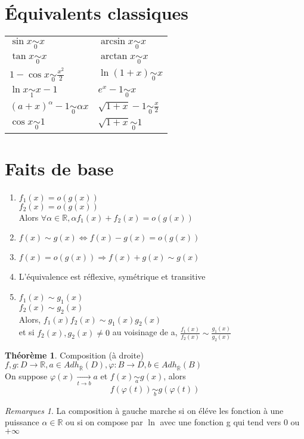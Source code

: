 \documentclass[fleqn]{article}
\theoremstyle{definition} \newtheorem*{defi}{D\'efinition}
\theoremstyle{definition} \newtheorem*{theo}{Th\'eor\`eme}
\theoremstyle{remark} \newtheorem*{rqs}{Remarques}
\begin{document}
\section{\'Equivalents classiques}
\begin{tabular}{@{}ll@{}}
		$\sin x \underset{0}{\sim} x$ & $\arcsin x \underset{0}{\sim} x$ \\
		$\tan x \underset{0}{\sim} x$ & $\arctan x \underset{0}{\sim} x$ \\
		$1 - \cos x \underset{0}{\sim} \frac{x^2}{2}$ & $\ln(1+x) \underset{0}{\sim} x$ \\
		$\ln x \underset{1}{\sim} x-1$ & $e^x -1 \underset{0}{\sim} x$ \\
		$(a+x)^{\alpha} -1 \underset{0}{\sim} \alpha x$ & $\sqrt{1+x} - 1 \underset{0}{\sim} \frac{x}{2}$ \\
		$\cos x \underset{0}{\sim} 1$ & $\sqrt{1+x} \underset{0}{\sim} 1$ \\
\end{tabular}

\section{Faits de base}
\begin{enumerate}
	\item $f_1(x) = o(g(x))$\\
		$f_2(x)	= o(g(x))$ \\
		Alors $\forall \alpha \in \mathbb{R}, \alpha f_1(x) + f_2(x) =  o(g(x))$
	\item $f(x) \sim g(x) \Leftrightarrow f(x) - g(x) = o(g(x))$
	\item $f(x) = o(g(x)) \Rightarrow f(x) + g(x) \sim g(x)$
	\item L'\'equivalence est r\'eflexive, sym\'etrique et transitive
	\item $f_1(x) \sim g_1(x)$\\
		$f_2(x) \sim g_2(x)$\\
		Alors, $f_1(x)f_2(x) \sim g_1(x)g_2(x)$ \\et si $f_2(x), g_2(x) \neq 0$ au voisinage de a, $\frac{f_1(x)}{f_2(x)} \sim
		\frac{g_1(x)}{g_2(x)}$
\end{enumerate}

\begin{theo} Composition (\`a droite)\\
	$f,g: D \rightarrow \mathbb{R}, a \in Adh_{\overline{\mathbb{R}}%
	}(D), \varphi: B \rightarrow D, b \in Adh_{\overline{\mathbb{R}}%
	}(B)$ \\
	On suppose $\varphi(x)\underset{t\rightarrow b}{\rightarrow} a$ et $f(x)\underset{a}{\sim} g(x)$, alors
	\[f(\varphi(t))\underset{b}{\sim} g(\varphi(t))\]
\end{theo}

\begin{rqs}
	La composition \`a gauche marche si on \'el\'eve les fonction \`a une puissance $\alpha \in \mathbb{R}$ ou si on compose par $\ln$ avec une
	fonction g qui tend vers $0$ ou $+\infty$
\end{rqs}
\end{document}
